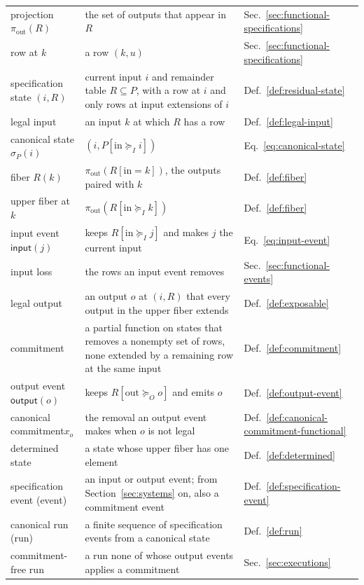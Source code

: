 \documentclass[sigconf]{cidr-2027}
\theoremstyle{remark}
\newcommand{\InputGe}{\succeq_I}
\newcommand{\OutputGe}{\succeq_O}
\newcommand{\commitment}{commitment\xspace}
\newcommand{\indescs}{input extensions\xspace}
\newcommand{\outrel}{extends\xspace}          %
\newcommand{\outrelpast}{extended\xspace}     %
\begin{document}
{\begin{tabular}{@{}>{\raggedright\arraybackslash}p{}>{\raggedright\arraybackslash}p{}>{\raggedright\arraybackslash}p{}@{}}
  projection $\pi_{\mathrm{out}}(R)$ & the set of outputs that appear in $R$ & Sec.~\ref{sec:functional-specifications}\\
  row at $k$ & a row $(k,u)$ & Sec.~\ref{sec:functional-specifications}\\
  specification state $(i,R)$ & current input $i$ and remainder table $R\subseteq P$, with a row at $i$ and only rows at \indescs of $i$ & Def.~\ref{def:residual-state}\\
  legal input & an input $k$ at which $R$ has a row & Def.~\ref{def:legal-input}\\
  canonical state $\sigma_P(i)$ & $(i,P[\mathrm{in}\InputGe i])$ & Eq.~\ref{eq:canonical-state}\\
  fiber $R(k)$ & $\pi_{\mathrm{out}}(R[\mathrm{in}=k])$, the outputs paired with $k$ & Def.~\ref{def:fiber}\\
  upper fiber at $k$ & $\pi_{\mathrm{out}}(R[\mathrm{in}\InputGe k])$ & Def.~\ref{def:fiber}\\
  input event $\mathsf{input}(j)$ & keeps $R[\mathrm{in}\InputGe j]$ and makes $j$ the current input & Eq.~\ref{eq:input-event}\\
  input loss & the rows an input event removes & Sec.~\ref{sec:functional-events}\\
  legal output & an output $o$ at $(i,R)$ that every output in the upper fiber \outrel & Def.~\ref{def:exposable}\\
  \commitment & a partial function on states that removes a nonempty set of rows, none \outrelpast by a remaining row at the same input & Def.~\ref{def:commitment}\\
  output event $\mathsf{output}(o)$ & keeps $R[\mathrm{out}\OutputGe o]$ and emits $o$ & Def.~\ref{def:output-event}\\
  canonical \commitment $x_o$ & the removal an output event makes when $o$ is not legal & Def.~\ref{def:canonical-commitment-functional}\\
  determined state & a state whose upper fiber has one element & Def.~\ref{def:determined}\\
  specification event (event) & an input or output event; from Section~\ref{sec:systems} on, also a \commitment event & Def.~\ref{def:specification-event}\\
  canonical run (run) & a finite sequence of specification events from a canonical state & Def.~\ref{def:run}\\
  \commitment-free run & a run none of whose output events applies a \commitment & Sec.~\ref{sec:executions}\\

\end{tabular}}
\end{document}
